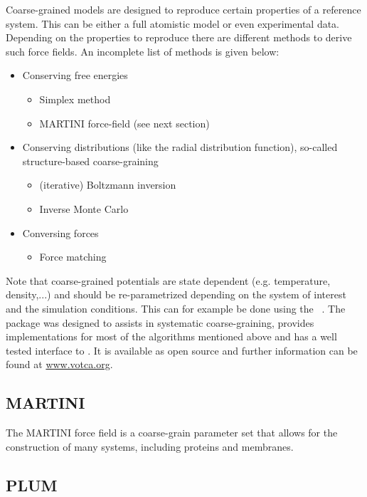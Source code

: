 Coarse-grained models are designed to reproduce certain properties of a reference system. This can be either a full atomistic model or even experimental data. Depending on the properties to reproduce there are different methods to derive such force fields. An incomplete list of methods is given below:
\begin{itemize}
\item Conserving free energies
\begin{itemize}
\item Simplex method
\item MARTINI force-field (see next section)
\end{itemize}
\item Conserving distributions (like the radial distribution function), so-called structure-based coarse-graining
\begin{itemize}
\item (iterative) Boltzmann inversion
\item Inverse Monte Carlo
\end{itemize}
\item Conversing forces
\begin{itemize}
\item Force matching
\end{itemize}
\end{itemize}

Note that coarse-grained potentials are state dependent (e.g. temperature, density,...) and should be re-parametrized depending on the system of interest and the simulation conditions. This can for example be done using the ~\cite{ruehle2009}. The package was designed to assists in systematic coarse-graining, provides implementations for most of the algorithms mentioned above and has a well tested interface to {\gromacs}. It is available as open source and further information can be found at \href{http://www.votca.org}{www.votca.org}.

\subsection{MARTINI}

The MARTINI force field is a coarse-grain parameter set that allows for the construction 
of many systems, including proteins and membranes.

\subsection{PLUM}

